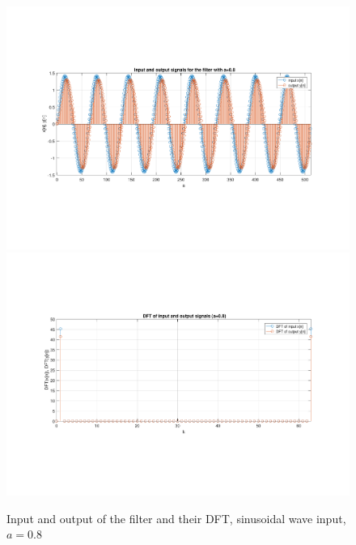 \begin{figure} [H]
	\centering
	\includegraphics[trim={2.5cm 5cm 2.5cm 5cm}, clip, width=0.75\linewidth]{io_sin_6}
	\includegraphics[trim={2.5cm 5cm 2.5cm 5cm}, clip, width=0.75\linewidth]{dft_sin_6}
	\caption{Input and output of the filter and their DFT, sinusoidal wave input, $a=0.8$}
	\label{fig:t1_io_sin_6}
\end{figure}
